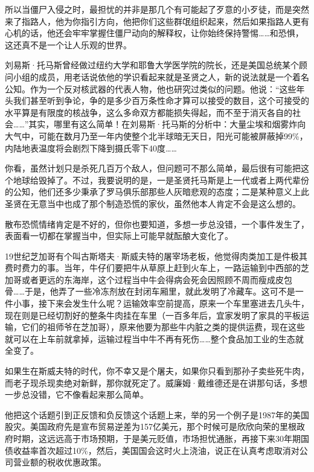 所以当僵尸入侵之时，最担忧的并非是那几个有可能起了歹意的小歹徒，而是突然来了指路人，他为你指引方向，他把你们这些群氓组织起来，然后如果指路人更有心机的话，他还会牢牢掌握住僵尸动向的解释权，让你始终保持警惕\ldots\ldots 和恐惧，这还真不是一个让人乐观的世界。

刘易斯·托马斯曾经做过纽约大学和耶鲁大学医学院的院长，还是美国总统某个顾问小组的成员，用老话说依他的学识看起来就是圣贤之人，新的说法就是一个着名公知。作为一个反对核武器的代表人物，他也研究过类似的问题。他说：``这些年头我们甚至听到争论，争的是多少百万条性命才算可以接受的数目，这个可接受的水平算是有限度的核战争，这么多命双方都能损失得起，而不至于消灭各自的社会\ldots\ldots{}''其实，哪里有这么简单！在刘易斯·托马斯的分析中：大量尘埃和烟雾炸向大气中，可能在数月乃至一年内使整个北半球暗无天日，阳光可能被屏蔽掉99\%，内陆地表温度将会剧烈下降到摄氏零下40度\ldots\ldots{}

你看，虽然计划只是杀死几百万个敌人，但问题可不那么简单，最后很有可能把这个地球给毁掉了。不过，我要说明的是，一是圣贤托马斯是上一代或者上两代辈份的公知，他们还多少秉承了罗马俱乐部那些人灰暗悲观的态度；二是某种意义上此圣贤在无意当中也成了那个制造恐慌的家伙，虽然他本人肯定不会是这么想的。

散布恐慌情绪肯定是不好的，但你也要知道，多想一步总没错，一个事件发生了，表面看一切都在掌握当中，但实际上可能早就酝酿大变化了。

19世纪芝加哥有个叫古斯塔夫·斯威夫特的屠宰场老板，他觉得肉类加工是件极其费时费力的事。当年，牛仔们要把牛从草原上赶到火车上，一路运输到中西部的芝加哥或者更远的东海岸，这个过程当中牛会得病会死会因照顾不周而瘦成皮包骨\ldots\ldots 于是，他弄了一些冷冻剂放在封闭车厢里，就此发明了冷藏车。这可不是一件小事，接下来会发生什么呢？运输效率空前提高，原来一个车里塞进去几头牛，现在则是已经切割好的整条牛肉挂在车里（一百多年后，宜家发明了家具的平板运输，它们的祖师爷在芝加哥），原来他要为那些牛内脏之类的提供运费，现在这些就可以在上车前就拿掉，运输过程当中牛不再有死伤\ldots\ldots 整个食品加工业的生态就全变了。

如果生在斯威夫特的时代，你不幸又是个屠夫，如果你只看到那孙子卖些死牛肉，而老子现杀现卖绝对新鲜，那你就死定了。威廉姆·戴维德还是在讲那句话，多想一步总没错，它不像看起来那么简单。

他把这个话题引到正反馈和负反馈这个话题上来，举的另一个例子是1987年的美国股灾。美国政府先是宣布贸易逆差为157亿美元，那个时候可是欣欣向荣的里根政府时期，这远远高于市场预期，于是美元贬值，市场担忧通胀，再接下来30年期国债收益率首次超过10\%，然后，美国国会这时火上浇油，说正在认真考虑取消对公司营业额的税收优惠政策。

